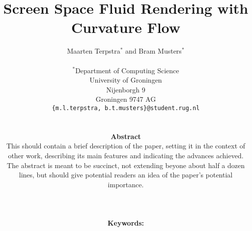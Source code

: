 \documentclass[a4paper, 10pt, twocolumn]{eguk2000}
\begin{document}

\title{Screen Space Fluid Rendering with Curvature Flow}
\author{{\sffamily Maarten Terpstra${}^\ast$ and Bram Musters${}^\ast$}\\
\\
${}^\ast$Department of Computing Science\\
University of Groningen\\
Nijenborgh 9\\
Groningen 9747 AG\\
{\tt \{m.l.terpstra, b.t.musters\}@student.rug.nl}\\
\\
\parbox{140truemm}{\normalsize
{\bfseries Abstract}\\
This should contain a brief description
of the paper, setting it in the context of other work, describing its
main features and indicating the advances achieved. The abstract is
meant to be succinct, not extending beyone about half a dozen lines,
but should give potential readers an idea of the paper's potential
importance.}
\\
\\
\parbox{140truemm}{\normalsize
{\bfseries Keywords:}
}
} %

\date{}


\maketitle 











\end{document}
